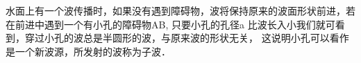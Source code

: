 
水面上有一个波传播时，如果没有遇到障碍物，波将保持原来的波面形状前进，若在前进中遇到一个有小孔的障碍物AB, 只要小孔的孔径a 比波长入小我们就可看到，穿过小孔的波总是半圆形的波，与原来波的形状无关，
这说明小孔可以看作是一个新波源，所发射的波称为子波．